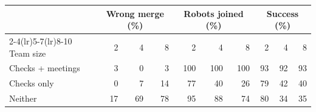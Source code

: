 \setlength{\tabcolsep}{3pt}
\begin{tabular}{lrrrrrrrrr}
\toprule
 & \multicolumn{3}{c}{Wrong merge (\%)} & \multicolumn{3}{c}{Robots joined (\%)} & \multicolumn{3}{c}{Success (\%)} \\
\cmidrule(lr){2-4}\cmidrule(lr){5-7}\cmidrule(lr){8-10}
Team size & 2 & 4 & 8 & 2 & 4 & 8 & 2 & 4 & 8 \\
\midrule
Checks + meetings & 3 & 0 & 3 & 100 & 100 & 100 & 93 & 92 & 93 \\
Checks only & 0 & 7 & 14 & 77 & 40 & 26 & 79 & 42 & 40 \\
Neither & 17 & 69 & 78 & 95 & 88 & 74 & 80 & 34 & 35 \\
\bottomrule
\end{tabular}
